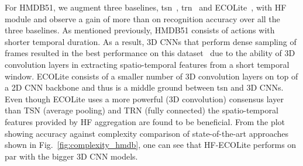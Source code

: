 \documentclass[journal,onecolumn]{IEEEtran}
\begin{document}
For HMDB51, we augment three baselines, \ac{tsn}~\cite{tsn}, \ac{trn}~\cite{trn} and ECOLite~\cite{eco}, with HF module and observe a gain of more than  on recognition accuracy over all the three baselines. As mentioned previously, HMDB51 consists of actions with shorter temporal duration. As a result, 3D CNNs that perform dense sampling of frames resulted in the best performance on this dataset~\cite{tran2018closer, carreira2017quo} due to the ability of 3D convolution layers in extracting spatio-temporal features from a short temporal window. ECOLite consists of a smaller number of 3D convolution layers on top of a 2D CNN backbone and thus is a middle ground between \ac{tsn} and 3D CNNs.
Even though ECOLite uses a more powerful (3D convolution) consensus layer than TSN (average pooling) and TRN (fully connected) the spatio-temporal features provided by HF aggregation are found to be beneficial. From the plot showing accuracy against complexity comparison of state-of-the-art approaches shown in Fig.~\ref{fig:complexity_hmdb}, one can see that HF-ECOLite performs on par with the bigger 3D CNN models. 
\end{document}
